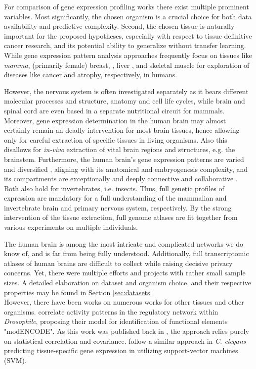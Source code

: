 \documentclass[]{article}
\renewcommand{\cite}{\citep}
\begin{document}
For comparison of gene expression profiling works there exist multiple prominent variables. Most significantly, the chosen organism is a crucial choice for both data availability and predictive complexity. Second, the chosen tissue is naturally important for the proposed hypotheses, especially with respect to tissue definitive cancer research, and its potential ability to generalize without transfer learning. While gene expression pattern analysis approaches frequently focus on tissues like \textit{mamma}, (primarily female) breast, \cite{herschkowitz2007identification}, liver \cite{flores2002patterns}, and skeletal muscle \cite{lecker2004multiple} for exploration of diseases like cancer and atrophy, respectively, in humans. 

However, the nervous system is often investigated separately as it bears different molecular processes and structure, anatomy and cell life cycles, while brain and spinal cord are even based in a separate nutritional circuit for mammals. Moreover, gene expression determination in the human brain may almost certainly remain an deadly intervention for most brain tissues, hence allowing only for careful extraction of specific tissues in living organisms. Also this disallows for \textit{in-vivo} extraction of vital brain regions and structures, e.g. the brainstem. Furthermore, the human brain's gene expression patterns are varied and diversified \cite{ramasamy2014genetic}, aligning with its anatomical and embryogenesis complexity, and its compartments are exceptionally and deeply connective and collaborative \cite{fornito2015connectomics}. Both also hold for invertebrates, i.e. insects. Thus, full genetic profiles of expression are mandatory for a full understanding of the mammalian and invertebrate brain and primary nervous system, respectively. By the strong intervention of the tissue extraction, full genome atlases are fit together from various experiments on multiple individuals.

The human brain is among the most intricate and complicated networks we do know of, and is far from being fully understood. Additionally, full transcriptomic atlases of human brains are difficult to collect while raising decisive privacy concerns. Yet, there were multiple efforts and projects with rather small sample sizes. A detailed elaboration on dataset and organism choice, and their respective properties may be found in Section \ref{sec:datasets}. \\

However, there have been works on numerous works for other tissues and other organisms. \citet{modencode2010identification} correlate activity patterns in the regulatory network within \textit{Drosophile}, proposing their model for identification of functional elements "modENCODE". As this work was published back in \citeyear{modencode2010identification}, the approach relies purely on statistical correlation and covariance. \citet{chikina2009global} follow a similar approach in \textit{C. elegans} predicting tissue-specific gene expression in \citeyear{noble2006support} utilizing support-vector machines (SVM)\cite{noble2006support}. 
\end{document}
